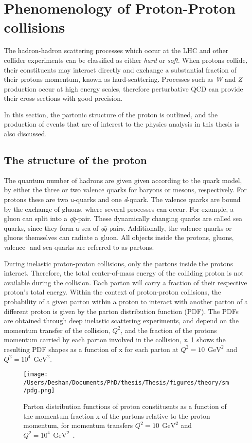 \section{Phenomenology of Proton-Proton collisions}
The hadron-hadron scattering processes which occur at the LHC and other collider experiments can be classified as either \textit{hard} or \textit{soft}. When protons collide, their constituents may interact directly and exchange a substantial fraction of their protons momentum, known as hard-scattering. Processes such as \emph{W} and \emph{Z} production occur at high energy scales, therefore perturbative QCD can provide their cross sections with good precision.

In this section, the partonic structure of the proton is outlined, and the production of events that are of interest to the physics analysis in this thesis is also discussed. 

\subsection{The structure of the proton}
The quantum number of hadrons are given given according to the quark model, by either the three or two valence quarks for baryons or mesons, respectively. For protons these are two \emph{u}-quarks and one \emph{d}-quark. The valence quarks are bound by the exchange of gluons, where several processes can occur. For example, a gluon can split into a \emph{q$\bar{q}$}-pair. These dynamically changing quarks are called sea quarks, since they form a sea of \emph{q$\bar{q}$}-pairs. Additionally, the valence quarks or gluons themselves can radiate a gluon. All objects inside the protons, gluons, valence- and sea-quarks are referred to as partons. 

During inelastic proton-proton collisions, only the partons inside the protons interact. Therefore, the total center-of-mass energy of the colliding proton is not available during the collision. Each parton will carry a fraction of their respective proton's total energy. Within the context of proton-proton collisions, the probability of a given parton within a proton to interact with another parton of a different proton is given by the parton distribution function (PDF). The PDFs are obtained through deep inelastic scattering experiments, and depend on the momentum transfer of the collision, $Q^2$, and the fraction of the protons momentum carried by each parton involved in the collision, \emph{x}. \cref{fig:pdg} shows the resulting PDF shapes as a function of x for each parton at $Q^2 = 10~\SI{}{\giga\electronvolt}^2$ and $Q^2 = 10^4~\SI{}{\giga\electronvolt}^2$. 
\begin{figure}[!htpb]
    \centering
    \texttt{[image: /Users/Deshan/Documents/PhD/thesis/Thesis/figures/theory/sm/pdg.png]}
    \caption{Parton distribution functions of proton constituents as a function of the momentum fraction x of the partons relative to the proton momentum, for momentum transfers $Q^2 = 10~\SI{}{\giga\electronvolt}^2$ and $Q^2 = 10^4~\SI{}{\giga\electronvolt}^2$~\cite{Ball:2014uwa}.}
    \label{fig:pdg}
\end{figure}

